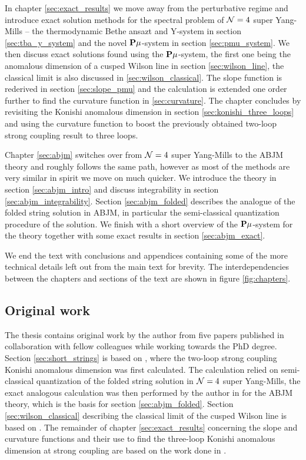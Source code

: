 In chapter \ref{sec:exact_results} we move away from the perturbative regime and introduce exact solution methods for the spectral problem of $\mathcal{N}=4$ super Yang-Mills -- the thermodynamic Bethe ansazt and Y-system in section \ref{sec:tba_y_system} and the novel ${\bf P}\mu$-system in section \ref{sec:pmu_system}.
We then discuss exact solutions found using the ${\bf P}\mu$-system, the first one being the anomalous dimension of a cusped Wilson line in section \ref{sec:wilson_line}, the classical limit is also discussed in \ref{sec:wilson_classical}.
The slope function is rederived in section \ref{sec:slope_pmu} and the calculation is extended one order further to find the curvature function in \ref{sec:curvature}.
The chapter concludes by revisiting the Konishi anomalous dimension in section \ref{sec:konishi_three_loops} and using the curvature function to boost the previously obtained two-loop strong coupling result to three loops.
 
Chapter \ref{sec:abjm} switches over from $\mathcal{N}=4$ super Yang-Mills to the ABJM theory and roughly follows the same path, however as most of the methods are very similar in spirit we move on much quicker.
We introduce the theory in section \ref{sec:abjm_intro} and discuss integrability in section \ref{sec:abjm_integrability}. 
Section \ref{sec:abjm_folded} describes the analogue of the folded string solution in ABJM, in particular the semi-classical quantization procedure of the solution.
We finish with a short overview of the ${\bf P}\mu$-system for the theory together with some exact results in section \ref{sec:abjm_exact}.

We end the text with conclusions and appendices containing some of the more technical details left out from the main text for brevity.
The interdependencies between the chapters and sections of the text are shown in figure \ref{fig:chapters}.

\newpage
\subsection{Original work}

The thesis contains original work by the author from five papers published in collaboration with fellow colleagues while working towards the PhD degree. 
Section \ref{sec:short_strings} is based on \cite{Gromov:2011bz}, where the two-loop strong coupling Konishi anomalous dimension was first calculated.
The calculation relied on semi-classical quantization of the folded string solution in $\mathcal{N}=4$ super Yang-Mills, the exact analogous calculation was then performed by the author in \cite{Beccaria:2012vb,Beccaria:2012qd} for the ABJM theory, which is the basis for section \ref{sec:abjm_folded}.
Section \ref{sec:wilson_classical} describing the classical limit of the cusped Wilson line is based on \cite{Sizov:2013joa}.
The remainder of chapter \ref{sec:exact_results} concerning the slope and curvature functions and their use to find the three-loop Konishi anomalous dimension at strong coupling are based on the work done in \cite{Gromov:2014bva}. 

